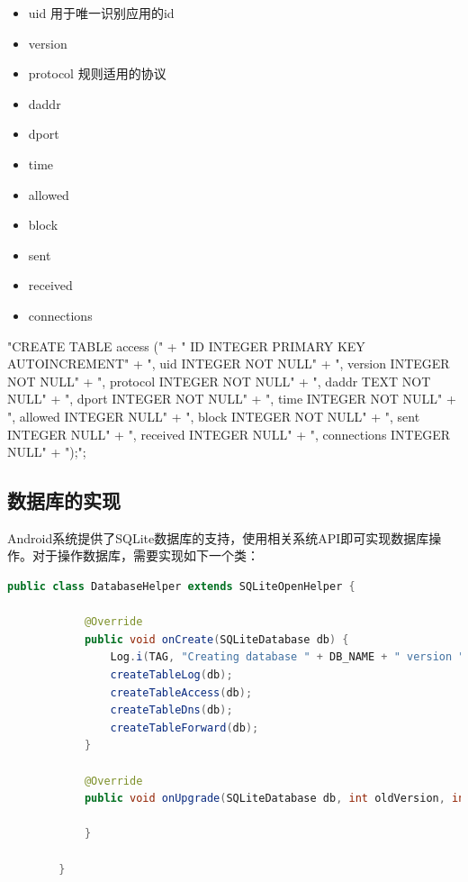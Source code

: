 \documentclass[format=final, language=chinese, degree=bachelor]{hustthesis}
\begin{document}
\begin{itemize}
    \item uid           用于唯一识别应用的id
    \item version
    \item protocol      规则适用的协议
    \item daddr
    \item dport

    \item time
    \item allowed
    \item block

    \item sent
    \item received
    \item connections
\end{itemize}

"CREATE TABLE access (" +
                " ID INTEGER PRIMARY KEY AUTOINCREMENT" +
                ", uid INTEGER NOT NULL" +
                ", version INTEGER NOT NULL" +
                ", protocol INTEGER NOT NULL" +
                ", daddr TEXT NOT NULL" +
                ", dport INTEGER NOT NULL" +
                ", time INTEGER NOT NULL" +
                ", allowed INTEGER NULL" +
                ", block INTEGER NOT NULL" +
                ", sent INTEGER NULL" +
                ", received INTEGER NULL" +
                ", connections INTEGER NULL" +
                ");";

\subsection{数据库的实现}

   Android系统提供了SQLite数据库的支持，使用相关系统API即可实现数据库操作。对于操作数据库，需要实现如下一个类：

\begin{lstlisting}[language=java]
        public class DatabaseHelper extends SQLiteOpenHelper {

            @Override
            public void onCreate(SQLiteDatabase db) {
                Log.i(TAG, "Creating database " + DB_NAME + " version " + DB_VERSION);
                createTableLog(db);
                createTableAccess(db);
                createTableDns(db);
                createTableForward(db);
            }

            @Override
            public void onUpgrade(SQLiteDatabase db, int oldVersion, int newVersion) {

            }

        }
\end{lstlisting}
\end{document}
